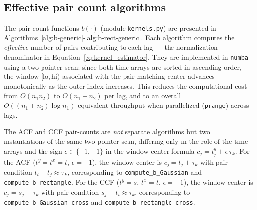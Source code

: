 \documentclass[twocolumn,10pt]{article}
\begin{document}
\subsection{Effective pair count algorithms}
\label{app:pair-count}
%
The pair-count functions $b(\cdot)$ (module \texttt{kernels.py}) are
presented in Algorithms~\ref{alg:b-generic}-\ref{alg:b-rect-generic}. Each
algorithm computes the \textit{effective} number of pairs contributing
to each lag --- the normalization denominator in
Equation~\ref{eq:kernel_estimator}. They are implemented in
\texttt{numba} using a two-pointer scan: since both time arrays are
sorted in ascending order, the window $[\mathrm{lo},\mathrm{hi})$ associated
with the pair-matching center advances monotonically as the outer
index increases. This reduces the computational cost from $O(n_1 n_2)$ to
$O(n_1+n_2)$ per lag, and to an overall $O((n_1+n_2)\log n_1)$-equivalent
throughput when parallelized (\texttt{prange}) across lags.

The ACF and CCF pair-counts are \emph{not} separate algorithms but two
instantiations of the same two-pointer scan, differing only in the role
of the time arrays and the sign $\epsilon\in\{+1,-1\}$ in the window-center
formula $c_j = t^{y}_j + \epsilon\,\tau_k$. For the ACF ($t^{y}=t^{x}=t$,
$\epsilon=+1$), the window center is $c_j = t_j+\tau_k$ with pair condition
$t_i-t_j\approx\tau_k$, corresponding to \texttt{compute\_b\_Gaussian} and
\texttt{compute\_b\_rectangle}. For the CCF ($t^{y}=s$, $t^{x}=t$,
$\epsilon=-1$), the window center is $c_j = s_j-\tau_k$ with pair condition
$s_j-t_i\approx\tau_k$, corresponding to \texttt{compute\_b\_Gaussian\_cross}
and \texttt{compute\_b\_rectangle\_cross}.
\end{document}
